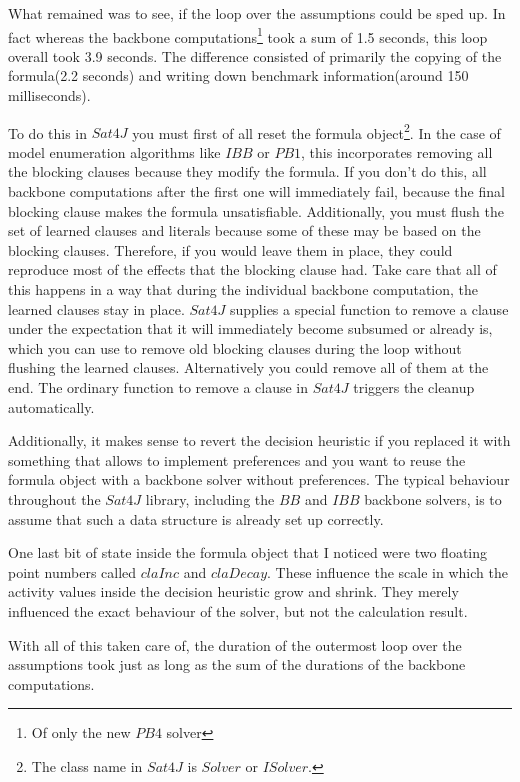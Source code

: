 What remained was to see, if the loop over the assumptions could be sped up. In fact whereas the backbone computations\footnote{Of only the new $PB4$ solver} took a sum of 1.5 seconds, this loop overall took 3.9 seconds. The difference consisted of primarily the copying of the formula(2.2 seconds) and writing down benchmark information(around 150 milliseconds). 

To do this in $Sat4J$ you must first of all reset the formula object\footnote{The class name in $Sat4J$ is $Solver$ or $ISolver$.}. In the case of model enumeration algorithms like $IBB$ or $PB1$, this incorporates removing all the blocking clauses because they modify the formula. If you don't do this, all backbone computations after the first one will immediately fail, because the final blocking clause makes the formula unsatisfiable. Additionally, you must flush the set of learned clauses and literals because some of these may be based on the blocking clauses. Therefore, if you would leave them in place, they could reproduce most of the effects that the blocking clause had. Take care that all of this happens in a way that during the individual backbone computation, the learned clauses stay in place. $Sat4J$ supplies a special function to remove a clause under the expectation that it will immediately become subsumed or already is, which you can use to remove old blocking clauses during the loop without flushing the learned clauses. Alternatively you could remove all of them at the end. The ordinary function to remove a clause in $Sat4J$ triggers the cleanup automatically. 

Additionally, it makes sense to revert the decision heuristic if you replaced it with something that allows to implement preferences and you want to reuse the formula object with a backbone solver without preferences. The typical behaviour throughout the $Sat4J$ library, including the $BB$ and $IBB$ backbone solvers, is to assume that such a data structure is already set up correctly.

One last bit of state inside the formula object that I noticed were two floating point numbers called $claInc$ and $claDecay$. These influence the scale in which the activity values inside the decision heuristic grow and shrink. They merely influenced the exact behaviour of the solver, but not the calculation result.

With all of this taken care of, the duration of the outermost loop over the assumptions took just as long as the sum of the durations of the backbone computations.